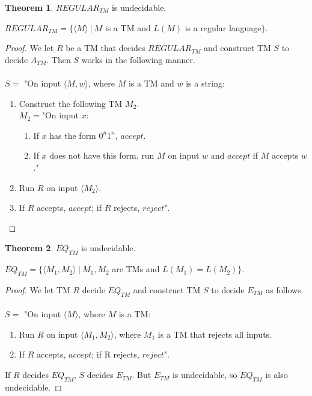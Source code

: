 \documentclass[11pt]{article}
\theoremstyle{definition}
\newtheorem{thm}{Theorem}[section]
\begin{document}
\begin{thm}
    $REGULAR_{TM}$ is undecidable.
    \begin{center}
        $REGULAR_{TM} = \{\langle M\rangle\ |\ M$ is a TM and $L(M)$ is a regular language$\}$.
    \end{center}
\end{thm}
\begin{proof}
    We let $R$ be a TM that decides $REGULAR_{TM}$ and construct TM $S$ to decide $A_{TM}$. Then $S$ works in the following manner.\\\\
    $S =$ "On input $\langle M,w \rangle$, where $M$ is a TM and $w$ is a string:
    \renewcommand{\labelenumii}{\arabic{enumii}.}
    \begin{enumerate}
        \item Construct the following TM $M_2$.\\
        $M_2 = $"On input $x$:
        \begin{enumerate}
            \item If $x$ has the form $0^n1^n$, $accept$.
            \item If $x$ does not have this form, run $M$ on input $w$ and $accept$ if $M$ accepts $w$."
        \end{enumerate}
        \item Run $R$ on input $\langle M_2\rangle$.
        \item If $R$ accepts, $accept$; if $R$ rejects, $reject$".
    \end{enumerate}
\end{proof}
\begin{thm}
    $EQ_{TM}$ is undecidable.
    \begin{center}
        $EQ_{TM} = \{\langle M_1, M_2\rangle\ |\ M_1, M_2$ are TMs and $L(M_1) = L(M_2)\}$.
    \end{center}
\end{thm}
\begin{proof}
    We let TM $R$ decide $EQ_{TM}$ and construct TM $S$ to decide $E_{TM}$ as follows.\\\\
    $S =$ "On input $\langle M \rangle$, where $M$ is a TM:
    \begin{enumerate}
        \item Run $R$ on input $\langle M_1, M_2\rangle$, where $M_1$ is a TM that rejects all inputs.
        \item If $R$ accepts, $accept$; if R rejects, $reject$".
    \end{enumerate}
    If $R$ decides $EQ_{TM}$, $S$ decides $E_{TM}$. But $E_{TM}$ is undecidable, so $EQ_{TM}$ is also undecidable.
\end{proof}
\end{document}
